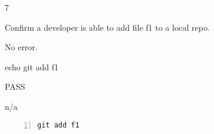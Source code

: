 \begin{description}[align=right,leftmargin=3.2cm,labelindent=3.0cm]
\item[Step:] 7
\item[Confirm:] Confirm a developer is able to add file f1 to a local repo.
\item[Expectation:] No error.
\item[Command:] echo git  add f1
\item[Test Result:] PASS
\item[Evidence:] n/a
\end{description}
\begin{lstlisting}[numbers=left]
git add f1

\end{lstlisting}
